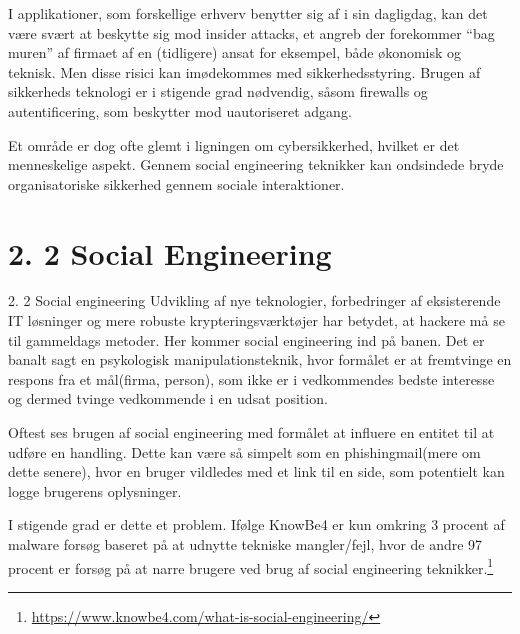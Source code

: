 \documentclass[11pt]{report}
\begin{document}
I applikationer, som forskellige erhverv benytter sig af i sin dagligdag, kan det være svært at beskytte sig mod insider attacks, et angreb der forekommer “bag muren” af firmaet af en (tidligere) ansat for eksempel, både økonomisk og teknisk. Men disse risici kan imødekommes med sikkerhedsstyring. Brugen af sikkerheds teknologi er i stigende grad nødvendig, såsom firewalls og autentificering, som beskytter mod uautoriseret adgang.


Et område er dog ofte glemt i ligningen om cybersikkerhed, hvilket er det menneskelige aspekt. Gennem social engineering teknikker kan ondsindede bryde organisatoriske sikkerhed gennem sociale interaktioner. 

\section*{2. 2 Social Engineering}
   2. 2 Social engineering
Udvikling af nye teknologier, forbedringer af eksisterende IT løsninger og mere robuste krypteringsværktøjer har betydet, at hackere må se til gammeldags metoder. Her kommer social engineering ind på banen. Det er banalt sagt en psykologisk manipulationsteknik, hvor formålet er at fremtvinge en respons fra et mål(firma, person), som ikke er i vedkommendes bedste interesse og dermed tvinge vedkommende i en udsat position.

Oftest ses brugen af social engineering med formålet at influere en entitet til at udføre en handling. Dette kan være så simpelt som en phishingmail(mere om dette senere), hvor en bruger vildledes med et link til en side, som potentielt kan logge brugerens oplysninger.


I stigende grad er dette et problem. Ifølge KnowBe4 er kun omkring 3 procent af malware forsøg baseret på at udnytte tekniske mangler/fejl, hvor de andre 97 procent er forsøg på at narre brugere ved brug af social engineering teknikker.\footnote{\url{https://www.knowbe4.com/what-is-social-engineering/}}
\end{document}
